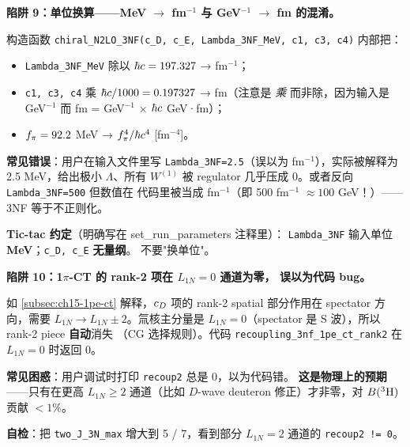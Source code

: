 \begin{pitfallbox}[label={pit:ch15-units}]
\textbf{陷阱 9：单位换算——MeV \(\to\) fm\(^{-1}\) 与 GeV\(^{-1}\) \(\to\) fm 的混淆。}

构造函数 \texttt{chiral\_N2LO\_3NF(c\_D, c\_E, Lambda\_3NF\_MeV, c1, c3, c4)}
内部把：
\begin{itemize}
\item \texttt{Lambda\_3NF\_MeV} 除以 \(\hbar c = 197.327\) → fm\(^{-1}\)；
\item \texttt{c1, c3, c4} 乘 \(\hbar c / 1000 = 0.197327\) → fm（注意是
      \emph{乘} 而非除，因为输入是 GeV\(^{-1}\) 而 fm = GeV\(^{-1}\) × \(\hbar c\) GeV·fm）；
\item \(f_\pi = 92.2\) MeV → \(f_\pi^4 / \hbar c^4\) [fm\(^{-4}\)]。
\end{itemize}

\textbf{常见错误}：用户在输入文件里写 \texttt{Lambda\_3NF=2.5}（误以为
fm\(^{-1}\)），实际被解释为 2.5 MeV，给出极小 \(\Lambda\)、所有 \(W^{(1)}\)
被 regulator 几乎压成 0。或者反向 \texttt{Lambda\_3NF=500} 但数值在
代码里被当成 fm\(^{-1}\)（即 500 fm\(^{-1}\) \(\approx 100\) GeV！）——
3NF 等于不正则化。

\textbf{Tic-tac 约定}（明确写在 set\_run\_parameters 注释里）：
\texttt{Lambda\_3NF} 输入单位 \textbf{MeV}；\texttt{c\_D, c\_E} \textbf{无量纲}。
不要"换单位"。
\end{pitfallbox}

\begin{pitfallbox}[label={pit:ch15-1pe-rank2-zero}]
\textbf{陷阱 10：1\(\pi\)-CT 的 rank-2 项在 \(L_{1N} = 0\) 通道为零，
误以为代码 bug。}

如 \cref{subsec:ch15-1pe-ct} 解释，\(c_D\) 项的 rank-2 spatial 部分作用在
spectator 方向，需要 \(L_{1N} \to L_{1N} \pm 2\)。氚核主分量是
\(L_{1N} = 0\)（spectator 是 S 波），所以 rank-2 piece \textbf{自动}消失
（CG 选择规则）。代码 \texttt{recoupling\_3nf\_1pe\_ct\_rank2} 在
\(L_{1N} = 0\) 时返回 0。

\textbf{常见困惑}：用户调试时打印 \texttt{recoup2} 总是 0，以为代码错。
\textbf{这是物理上的预期}——只有在更高 \(L_{1N} \geq 2\) 通道（比如
\(D\)-wave deuteron 修正）才非零，对 \(B(^3{\rm H})\) 贡献 \(< 1\%\)。

\textbf{自检}：把 \texttt{two\_J\_3N\_max} 增大到 5 / 7，看到部分
\(L_{1N} = 2\) 通道的 \texttt{recoup2 != 0}。
\end{pitfallbox}

